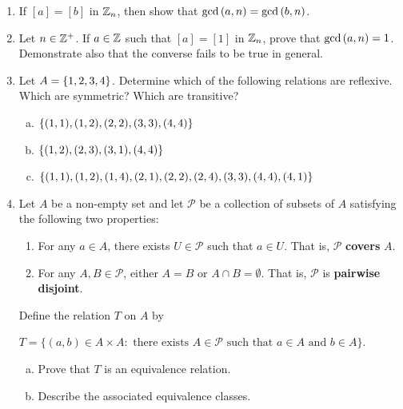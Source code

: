 \documentclass[11pt,fleqn,dvipsnames,usenames]{article}
\begin{document}
\begin{enumerate}
\item If $[a] = [b]$ in $\mathbb{Z}_{n}$, then show that $\text{gcd}\left(a,n\right) = \text{gcd}\left(b,n\right)$.
\item Let $n\in\mathbb{Z}^{+}$.  If $a\in \mathbb{Z}$ such that $[a] = [1]$ in $\mathbb{Z}_{n}$, prove that $\text{gcd}\left(a,n\right) = 1$.  Demonstrate also that the converse fails to be true in general.
\item Let $A = \left\{1,2,3,4\right\}$.  Determine which of the following relations are reflexive.  Which are symmetric?  Which are transitive?
\begin{enumerate}[(a)]
\item $\left\{(1,1), (1,2), (2,2), (3,3), (4,4)\right\}$
\item $\left\{(1,2), (2,3), (3,1), (4,4)\right\}$
\item $\left\{(1,1), (1,2), (1,4), (2,1), (2,2), (2,4), (3,3), (4,4), (4,1)\right\}$
\end{enumerate}
\item Let $A$ be a non-empty set and let $\mathcal{P}$ be a collection of subsets of $A$ satisfying the following two properties:
\begin{enumerate}[(1)]
\item For any $a\in A$, there exists $U\in\mathcal{P}$ such that $a\in U$.  That is, $\mathcal{P}$ \textbf{covers} $A$.
\item For any $A,B\in\mathcal{P}$, either $A = B$ or $A\cap B = \emptyset$.  That is, $\mathcal{P}$ is \textbf{pairwise disjoint}.
\end{enumerate}
Define the relation $T$ on $A$ by
\begin{center}
$T = \big\{(a,b)\in A\times A:\text{ there exists }A\in\mathcal{P}\text{ such that }a\in A\text{ and }b\in A\big\}$.
\end{center}
\begin{enumerate}[(a)]
\item Prove that $T$ is an equivalence relation.
\item Describe the associated equivalence classes.
\end{enumerate}
\end{enumerate}
\end{document}
